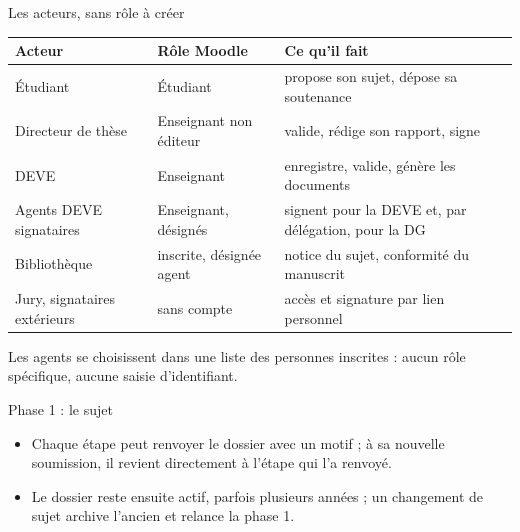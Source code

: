 \documentclass[aspectratio=169,11pt]{beamer}
\begin{document}
\begin{frame}{Les acteurs, sans rôle à créer}
  \small
  \begin{tabularx}{\textwidth}{@{}llX@{}}
    \toprule
    \textbf{Acteur} & \textbf{Rôle Moodle} & \textbf{Ce qu'il fait} \\
    \midrule
    Étudiant & Étudiant & propose son sujet, dépose sa soutenance \\
    Directeur de thèse & Enseignant non éditeur & valide, rédige son rapport, signe \\
    DEVE & Enseignant & enregistre, valide, génère les documents \\
    Agents DEVE signataires & Enseignant, désignés & signent pour la DEVE et, par délégation, pour la DG \\
    Bibliothèque & inscrite, désignée agent & notice du sujet, conformité du manuscrit \\
    Jury, signataires extérieurs & sans compte & accès et signature par lien personnel \\
    \bottomrule
  \end{tabularx}
  \vfill
  \small Les agents se \alert{choisissent dans une liste} des personnes inscrites : aucun rôle spécifique, aucune saisie d'identifiant.
\end{frame}

\begin{frame}{Phase 1 : le sujet}
  \centering
  \vfill
  \begin{itemize}
    \item Chaque étape peut \alert{renvoyer} le dossier avec un motif ; à sa nouvelle soumission, il revient directement à l'étape qui l'a renvoyé.
    \item Le dossier reste ensuite actif, parfois plusieurs années ; un \alert{changement de sujet} archive l'ancien et relance la phase 1.
  \end{itemize}
\end{frame}
\end{document}
